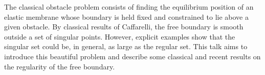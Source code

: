 \mypage
{}
\begin{myabstract}   
The classical obstacle problem consists of finding the equilibrium position of an elastic membrane whose boundary is held fixed and constrained to lie above a given obstacle. By classical results of Caffarelli, the free boundary is smooth outside a set of singular points. However, explicit examples show that the singular set could be, in general, as large as the regular set. This talk aims to introduce this beautiful problem and describe some classical and recent results on the regularity of the free boundary.
\end{myabstract}


